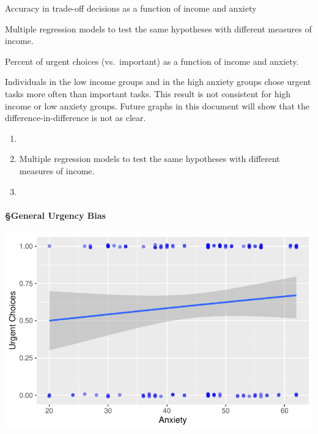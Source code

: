 Accuracy in trade-off decisions as a function of income and anxiety

Multiple regression models to test the same hypotheses with different
measures of income.

Percent of urgent choices (vs.~important) as a function of income and
anxiety.

\begin{tcolorbox}[enhanced jigsaw, toptitle=1mm, coltitle=black, colframe=quarto-callout-note-color-frame, colbacktitle=quarto-callout-note-color!10!white, titlerule=0mm, opacityback=0, rightrule=.15mm, bottomtitle=1mm, title=\textcolor{quarto-callout-note-color}{\faInfo}\hspace{0.5em}{Key Result}, bottomrule=.15mm, breakable, left=2mm, arc=.35mm, toprule=.15mm, leftrule=.75mm, colback=white, opacitybacktitle=0.6]

Individuals in the low income groups and in the high anxiety groups
chose urgent tasks more often than important tasks. This result is not
consistent for high income or low anxiety groups. Future graphs in this
document will show that the difference-in-difference is not as clear.

\end{tcolorbox}

\begin{enumerate}
\def\labelenumi{\arabic{enumi}.}
\item
\item
  Multiple regression models to test the same hypotheses with different
  measures of income.
\item
\end{enumerate}

\hypertarget{general-urgency-bias}{%
\paragraph{§General Urgency Bias}\label{general-urgency-bias}}

\includegraphics{thesis-file-ppq_files/figure-latex/pca-stai-urg-bias-1.pdf}

